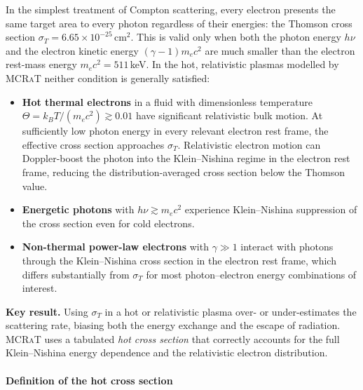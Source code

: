 \documentclass[12pt,a4paper]{article}
\newcommand{\mcrat}{\textsc{MCRaT}}
\newenvironment{keyresult}{%
	\begin{framed}\noindent\textbf{Key result.}\quad}
	{\end{framed}}
\begin{document}
In the simplest treatment of Compton scattering, every electron presents
the same target area to every photon regardless of their energies: the
Thomson cross section $\sigma_T = 6.65 \times 10^{-25}$\,cm$^2$.  This
is valid only when both the photon energy $h\nu$ and the electron kinetic
energy $(\gamma - 1) m_e c^2$ are much smaller than the electron rest-mass
energy $m_e c^2 = 511$\,keV.  In the hot, relativistic plasmas modelled by
\mcrat{} neither condition is generally satisfied:

\begin{itemize}
	\item \textbf{Hot thermal electrons} in a fluid with dimensionless
	temperature $\Theta = k_B T / (m_e c^2) \gtrsim 0.01$ have significant
	relativistic bulk motion.  At sufficiently low photon energy in every relevant electron rest frame,
	the effective cross section approaches $\sigma_T$. Relativistic electron
	motion can Doppler-boost the photon into the Klein--Nishina regime in the
	electron rest frame, reducing the distribution-averaged cross section
	below the Thomson value.
	
	\item \textbf{Energetic photons} with $h\nu \gtrsim m_e c^2$ experience
	Klein--Nishina suppression of the cross section even for cold electrons.
	
	\item \textbf{Non-thermal power-law electrons} with $\gamma \gg 1$
	interact with photons through the Klein--Nishina cross section in the
	electron rest frame, which differs substantially from $\sigma_T$ for
	most photon--electron energy combinations of interest.
\end{itemize}

\begin{keyresult}
	Using $\sigma_T$ in a hot or relativistic plasma over- or under-estimates
	the scattering rate, biasing both the energy exchange and the escape of
	radiation.  \mcrat{} uses a tabulated \emph{hot cross section} that
	correctly accounts for the full Klein--Nishina energy dependence and the
	relativistic electron distribution.
\end{keyresult}

\paragraph{Definition of the hot cross section}
\end{document}
